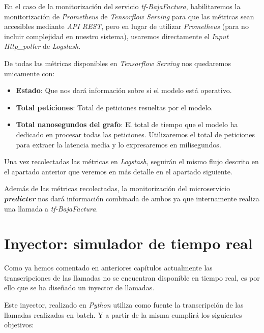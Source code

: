 En el caso de la monitorización del servicio \textit{tf-BajaFactura}, habilitaremos la monitorización de \textit{Prometheus} de \textit{Tensorflow Serving} para que las métricas sean accesibles mediante \textit{API REST}, pero en lugar de utilizar \textit{Prometheus} (para no incluir complejidad en nuestro sistema), usaremos directamente el \textit{Input} \textit{Http\_poller} de \textit{Logstash}.

De todas las métricas disponibles en \textit{Tensorflow Serving} nos quedaremos unicamente con: 

\begin{itemize}
\item \textbf{Estado}: Que nos dará información sobre si el modelo está operativo.  

\item \textbf{Total peticiones}: Total de peticiones resueltas por el modelo.

\item \textbf{Total nanosegundos del grafo}: El total de tiempo que el modelo ha dedicado en procesar todas las peticiones. Utilizaremos el total de peticiones para extraer la latencia media y lo expresaremos en milisegundos. 

\end{itemize}




Una vez recolectadas las métricas en \textit{Logstash}, seguirán el mismo flujo descrito en el apartado anterior que veremos en más detalle en el apartado siguiente. 

Además de las métricas recolectadas, la monitorización del microservicio \textit{\textbf{predicter}} nos dará información combinada de ambos ya que internamente realiza una llamada a \textit{tf-BajaFactura}.



\section{Inyector: simulador de tiempo real}
Como ya hemos comentado en anteriores capítulos actualmente las transcripciones de las llamadas no se encuentran disponible en tiempo real, es por ello que se ha diseñado un inyector de llamadas.

Este inyector, realizado en \textit{Python} utiliza como fuente la transcripción de las llamadas realizadas en batch. Y a partir de la misma cumplirá los siguientes objetivos: 

